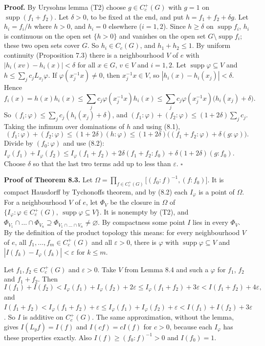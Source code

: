 \documentclass[
  english,
  11pt,
  a4paper,
]{article}
\newcounter{none} %
\begin{document}
\textbf{Proof.} By Urysohn\textquotesingle s lemma (T2) choose
\(g\in C_c^+(G)\) with \(g=1\) on \(\operatorname{supp}(f_1+f_2)\). Let
\(\delta>0\), to be fixed at the end, and put \(h=f_1+f_2+\delta g\).
Let \(h_i=f_i/h\) where \(h>0\), and \(h_i=0\) elsewhere (\(i=1,2\)).
Since \(h\geq\delta\) on \(\operatorname{supp}f_i\), \(h_i\) is
continuous on the open set \(\{h>0\}\) and vanishes on the open set
\(G\setminus\operatorname{supp}f_i\); these two open sets cover \(G\).
So \(h_i\in C_c(G)\), and \(h_1+h_2\leq1\). By uniform continuity
(Proposition 7.3) there is a neighbourhood \(V\) of \(e\) with
\(|h_i(xv)-h_i(x)|<\delta\) for all \(x\in G\), \(v\in V\) and
\(i=1,2\). Let \(\operatorname{supp}\varphi\subseteq V\) and
\(h\leq\sum_jc_jL_{x_j}\varphi\). If \(\varphi(x_j^{-1}x)\neq0\), then
\(x_j^{-1}x\in V\), so \(|h_i(x)-h_i(x_j)|<\delta\). Hence
\[f_i(x)=h(x)h_i(x)\leq\sum_jc_j\varphi(x_j^{-1}x)h_i(x)\leq\sum_jc_j\varphi(x_j^{-1}x)\big(h_i(x_j)+\delta\big).\]
So \((f_i:\varphi)\leq\sum_jc_j(h_i(x_j)+\delta)\), and
\((f_1:\varphi)+(f_2:\varphi)\leq(1+2\delta)\sum_jc_j\). Taking the
infimum over dominations of \(h\) and using (8.1),
\[(f_1:\varphi)+(f_2:\varphi)\leq(1+2\delta)(h:\varphi)\leq(1+2\delta)\big((f_1+f_2:\varphi)+\delta(g:\varphi)\big).\]
Divide by \((f_0:\varphi)\) and use (8.2):
\(I_\varphi(f_1)+I_\varphi(f_2)\leq I_\varphi(f_1+f_2)+2\delta(f_1+f_2:f_0)+\delta(1+2\delta)(g:f_0)\).
Choose \(\delta\) so that the last two terms add up to less than
\(\varepsilon\). \(\square\)

\textbf{Proof of Theorem 8.3.} Let
\(\Omega=\prod_{f\in C_c^+(G)}\big[(f_0:f)^{-1},(f:f_0)\big]\). It is
compact Hausdorff by Tychonoff\textquotesingle s theorem, and by (8.2)
each \(I_\varphi\) is a point of \(\Omega\). For a neighbourhood \(V\)
of \(e\), let \(\Phi_V\) be the closure in \(\Omega\) of
\(\{I_\varphi:\varphi\in C_c^+(G),\ \operatorname{supp}\varphi\subseteq V\}\).
It is nonempty by (T2), and
\(\Phi_{V_1}\cap\dots\cap\Phi_{V_n}\supseteq\Phi_{V_1\cap\dots\cap V_n}\neq\varnothing\).
By compactness some point \(I\) lies in every \(\Phi_V\). By the
definition of the product topology this means: for every neighbourhood
\(V\) of \(e\), all \(f_1,\dots,f_m\in C_c^+(G)\) and all
\(\varepsilon>0\), there is \(\varphi\) with
\(\operatorname{supp}\varphi\subseteq V\) and
\(|I(f_k)-I_\varphi(f_k)|<\varepsilon\) for \(k\leq m\).

Let \(f_1,f_2\in C_c^+(G)\) and \(\varepsilon>0\). Take \(V\) from Lemma
8.4 and such a \(\varphi\) for \(f_1\), \(f_2\) and \(f_1+f_2\). Then
\[I(f_1)+I(f_2)<I_\varphi(f_1)+I_\varphi(f_2)+2\varepsilon\leq I_\varphi(f_1+f_2)+3\varepsilon<I(f_1+f_2)+4\varepsilon,\]
and
\(I(f_1+f_2)<I_\varphi(f_1+f_2)+\varepsilon\leq I_\varphi(f_1)+I_\varphi(f_2)+\varepsilon<I(f_1)+I(f_2)+3\varepsilon\).
So \(I\) is additive on \(C_c^+(G)\). The same approximation, without
the lemma, gives \(I(L_yf)=I(f)\) and \(I(cf)=cI(f)\) for \(c>0\),
because each \(I_\varphi\) has these properties exactly. Also
\(I(f)\geq(f_0:f)^{-1}>0\) and \(I(f_0)=1\).
\end{document}
